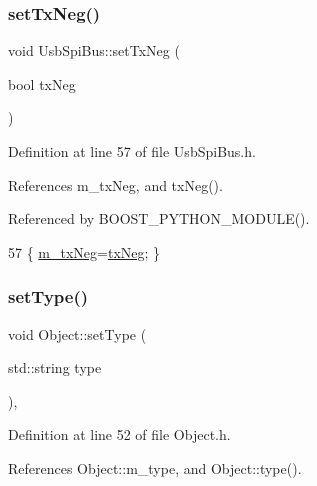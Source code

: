 \subsubsection{\texorpdfstring{set\+Tx\+Neg()}{setTxNeg()}}
{\footnotesize\ttfamily void Usb\+Spi\+Bus\+::set\+Tx\+Neg (\begin{DoxyParamCaption}\item[{bool}]{tx\+Neg }\end{DoxyParamCaption})\hspace{0.3cm}{\ttfamily [inline]}}



Definition at line 57 of file Usb\+Spi\+Bus.\+h.



References m\+\_\+tx\+Neg, and tx\+Neg().



Referenced by B\+O\+O\+S\+T\+\_\+\+P\+Y\+T\+H\+O\+N\+\_\+\+M\+O\+D\+U\+L\+E().


\begin{DoxyCode}
57 \{ \hyperlink{classUsbSpiBus_a48528e7dcb036ecc1732581a89e16d10}{m\_txNeg}=\hyperlink{classUsbSpiBus_a08605d71903fc384ed119842833485f1}{txNeg}; \}
\end{DoxyCode}
\mbox{\label{classObject_aae534cc9d982bcb9b99fd505f2e103a5}} 
\subsubsection{\texorpdfstring{set\+Type()}{setType()}}
{\footnotesize\ttfamily void Object\+::set\+Type (\begin{DoxyParamCaption}\item[{std\+::string}]{type }\end{DoxyParamCaption})\hspace{0.3cm}{\ttfamily [inline]}, {\ttfamily [inherited]}}



Definition at line 52 of file Object.\+h.



References Object\+::m\+\_\+type, and Object\+::type().



